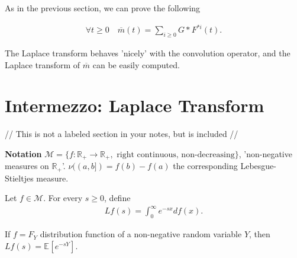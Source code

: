 As in the previous section, we can prove the following
\begin{prop}[]
	\begin{align}
		\forall t\geq 0 \quad \overline{m}(t) = \sum_{i\geq 0}^{} G * F^{*i}(t).
	\end{align}
\end{prop}

The Laplace transform behaves 'nicely' with the convolution operator, and the Laplace transform of $\overline{m}$ can be easily computed.
{\color{blue}
\section{Intermezzo: Laplace Transform} 
// This is not a labeled section in your notes, but is included //}

\noindent
\textbf{Notation} $ \mathcal{M} = \{ f: \mathbb{R}_+ \to \mathbb{R}_+, \textrm{ right continuous, non-decreasing}\}$, 'non-negative measures on $\mathbb{R}_+$'. {\color{blue} $\nu((a,b])=f(b)-f(a)$ the corresponding Lebesgue-Stieltjes measure.}

\begin{defn}
	Let $f\in \mathcal{M}$. For every $s \geq 0$, define
	\begin{align}
		\boxed{ Lf(s) = \int_{0}^{\infty} e^{-sx}df(x).}
	\end{align}
\end{defn}
\begin{rmk}[]
	If $f=F_Y$ distribution function of a non-negative random variable $Y$, then $Lf(s) = \mathbb{E}_{} \left[ e^{-sY} \right] $.
\end{rmk}

